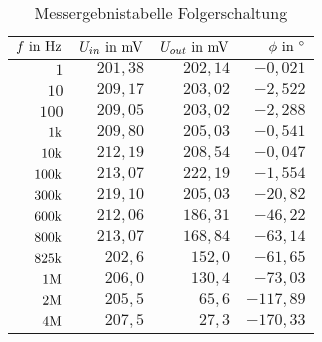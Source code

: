 \begin{table}[H]
\centering
\caption{Messergebnistabelle Folgerschaltung}
\label{tab:folger_erg_tab}
\begin{tabular}{|r|r|r|r|}
\hline
\rowcolor[HTML]{C0C0C0} 
$f\text{ in }\text{Hz}$       & $U_{in}\text{ in }\text{mV}$    & $U_{out}\text{ in }\text{mV}$   & $\phi\text{ in }^\circ$        \\ \hline
$1$    & $201,38$ & $202,14$ & $-0,021$  \\ \hline
$10$   & $209,17$ & $203,02$ & $-2,522$  \\ \hline
$100$  & $209,05$ & $203,02$ & $-2,288$  \\ \hline
$1\text{k}$   & $209,80$ & $205,03$ & $-0,541$  \\ \hline
$10\text{k}$   & $212,19$ & $208,54$ & $-0,047$  \\ \hline
$100\text{k}$ & $213,07$ & $222,19$ & $-1,554$  \\ \hline
$300\text{k}$ & $219,10$ & $205,03$ & $-20,82$  \\ \hline
$600\text{k}$ & $212,06$ & $186,31$ & $-46,22$  \\ \hline
$800\text{k}$ & $213,07$ & $168,84$ & $-63,14$  \\ \hline
$825\text{k}$ & $202,6$  & $152,0$  & $-61,65$  \\ \hline
$1\text{M}$   & $206,0$  & $130,4$  & $-73,03$  \\ \hline
$2\text{M}$   & $205,5$  & $65,6$   & $-117,89$ \\ \hline
$4\text{M}$   & $207,5$  & $27,3$   & $-170,33$ \\ \hline
\end{tabular}
\end{table}